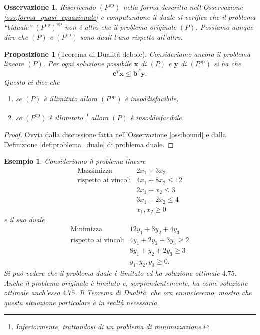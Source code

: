 \documentclass[italian, letter paper, 12pt, reqno]{article}
\theoremstyle{myteo}
\newtheorem{proposition}[theorem]{Proposizione}
\newtheorem{example}[theorem]{Esempio}
\newtheorem{remark}[theorem]{Osservazione}
\numberwithin{equation}{section}
\newcommand{\dual}[1]{#1^{\text{op}}}
\begin{document}
\begin{remark}
  \label{oss:duale_del_duale}
  Riscrivendo \((\dual{P})\) nella forma descritta nell'Osservazione \ref{oss:forma_quasi_equazionale} e computandone il duale si verifica che il problema ``biduale'' \((\dual{P})^{\text{op}}\) non è altro che il problema originale \((P)\).
  Possiamo dunque dire che \((P)\) e \((\dual{P})\) sono duali l'uno rispetto all'altro.
\end{remark}

\begin{proposition}[Teorema di Dualità debole]
  \label{prop:dualità_debole}
  Consideriamo ancora il problema lineare \((P)\).
  Per ogni soluzione possibile \(\mathbf{x}\) di \((P)\) e \(\mathbf{y}\) di \((\dual{P})\) si ha che
  \[\mathbf{c}^T\mathbf{x} \leq \mathbf{b}^T\mathbf{y}.\]
  Questo ci dice che
  \begin{enumerate}
  \item se \((P)\) è illimitato allora \((\dual{P})\) è insoddisfacibile,
  \item se \((\dual{P})\) è illimitato \footnote{Inferiormente, trattandosi di un problema di minimizzazione.} allora \((P)\) è insoddisfacibile.
  \end{enumerate}
\end{proposition}

\begin{proof}
  Ovvia dalla discussione fatta nell'Osservazione \ref{oss:bound} e dalla Definizione \ref{def:problema_duale} di problema duale.
\end{proof}

\begin{example}
  \label{es:problema_duale}
  Consideriamo il problema lineare
  \begin{equation*}
    \begin{array}{ll}
      \text{Massimizza} & 2x_1 + 3x_2\\
      \text{rispetto ai vincoli} & 4x_1 + 8x_2 \leq 12\\
                        & 2x_1 + x_2 \leq 3\\
                        & 3x_1 + 2x_2 \leq 4\\
                        & x_1, x_2\geq 0
    \end{array}
  \end{equation*}
  e il suo duale
  \begin{equation*}
    \begin{array}{ll}
      \text{Minimizza} & 12y_1 + 3y_2 + 4y_3\\
      \text{rispetto ai vincoli} & 4y_1 + 2y_2 + 3y_3 \geq 2\\
                       & 8y_1 + y_2 + 2 y_3 \geq 3\\
                       & y_1, y_2, y_3 \geq 0.
    \end{array}
  \end{equation*}
  Si può vedere che il problema duale è limitato ed ha soluzione ottimale \(4.75\).
  Anche il problema originale è limitato e, sorprendentemente, ha come soluzione ottimale anch'esso \(4.75\).
  Il Teorema di Dualità, che ora enuncieremo, mostra che questa situazione particolare è in realtà necessaria.
\end{example}
\end{document}
